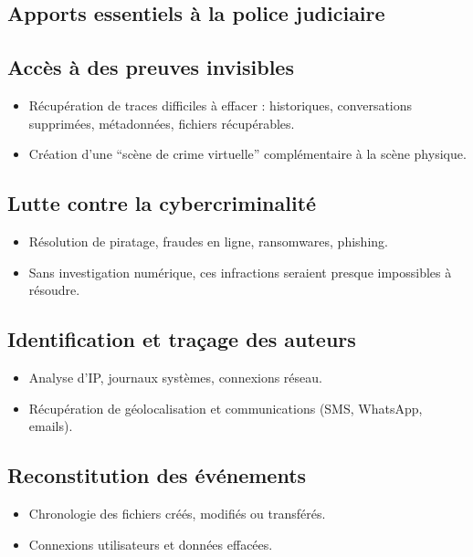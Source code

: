 \documentclass[12pt]{article}
\begin{document}
\begin{center}
\subsection*{ Apports essentiels à la police judiciaire}

\subsection{ Accès à des preuves invisibles}
\begin{itemize}[leftmargin=*, label=\textbullet]
    \item Récupération de traces difficiles à effacer : historiques, conversations supprimées, métadonnées, fichiers récupérables.
    \item Création d’une ``scène de crime virtuelle'' complémentaire à la scène physique.
\end{itemize}

\subsection{ Lutte contre la cybercriminalité}
\begin{itemize}[leftmargin=*, label=\textbullet]
    \item Résolution de piratage, fraudes en ligne, ransomwares, phishing.
    \item Sans investigation numérique, ces infractions seraient presque impossibles à résoudre.
\end{itemize}

\subsection{ Identification et traçage des auteurs}
\begin{itemize}[leftmargin=*, label=\textbullet]
    \item Analyse d’IP, journaux systèmes, connexions réseau.
    \item Récupération de géolocalisation et communications (SMS, WhatsApp, emails).
\end{itemize}

\subsection{ Reconstitution des événements}
\begin{itemize}[leftmargin=*, label=\textbullet]
    \item Chronologie des fichiers créés, modifiés ou transférés.
    \item Connexions utilisateurs et données effacées.
\end{itemize}


\end{center}
\end{document}
